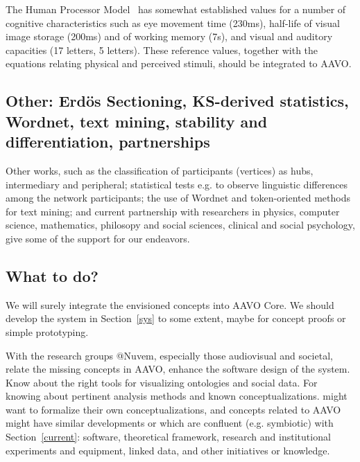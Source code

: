 \documentclass[letterpaper,10pt]{article}
\begin{document}
The Human Processor Model~\cite{HPM}
has somewhat established values for
a number of cognitive characteristics such as eye movement time (230ms),
half-life of visual image storage (200ms) and 
of
working memory (7s),
and visual and auditory capacities (17 letters, 5 letters).
These reference values, together with the
equations relating physical and perceived stimuli,
should be integrated to AAVO.

\subsection{Other: Erdös Sectioning, KS-derived statistics, Wordnet,
text mining, stability and differentiation, partnerships}
Other works, such as the classification of participants (vertices) as
hubs, intermediary and peripheral; statistical tests e.g. to
observe linguistic differences among the network participants;
the use of Wordnet and token-oriented methods for text mining;
and current partnership with researchers in physics, computer science,
mathematics, philosopy and social sciences, clinical and social psychology,
give some of the support for our endeavors.

\subsection{What to do?}
We will surely integrate the envisioned concepts into AAVO Core.
We should develop the system in Section~\ref{sys} to some extent,
maybe for concept proofs or simple prototyping.

With the research groups @Nuvem, 
especially those audiovisual and societal,
relate the missing concepts in AAVO,
enhance the software design of the system.
Know about the right tools for visualizing
ontologies and social data.
For knowing about pertinent analysis methods
and known conceptualizations.
might want to formalize their own conceptualizations,
and concepts related to AAVO might have similar developments
or which are confluent (e.g. symbiotic)
with Section~\ref{current}: software,
theoretical framework, research and institutional experiments and equipment,
linked data, and other initiatives or knowledge.
\end{document}
